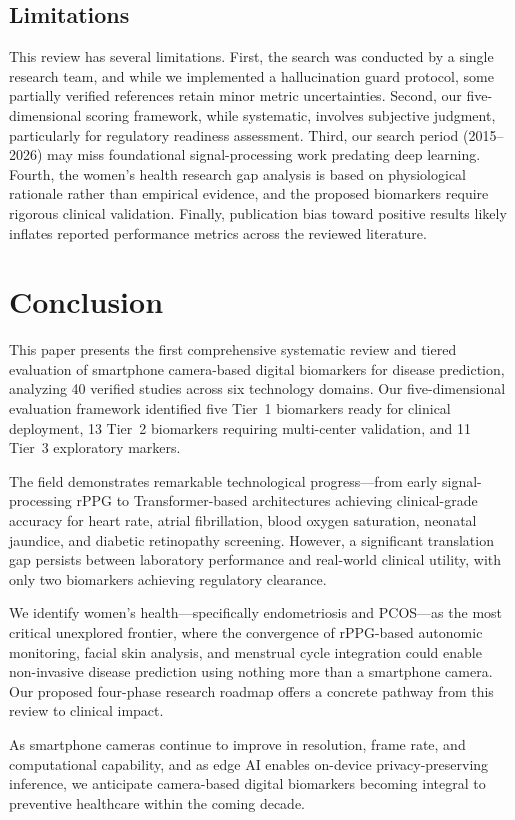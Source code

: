 \documentclass[conference]{IEEEtran}
\begin{document}
\subsection{Limitations}

This review has several limitations. First, the search was conducted by a single research team, and while we implemented a hallucination guard protocol, some partially verified references retain minor metric uncertainties. Second, our five-dimensional scoring framework, while systematic, involves subjective judgment, particularly for regulatory readiness assessment. Third, our search period (2015--2026) may miss foundational signal-processing work predating deep learning. Fourth, the women's health research gap analysis is based on physiological rationale rather than empirical evidence, and the proposed biomarkers require rigorous clinical validation. Finally, publication bias toward positive results likely inflates reported performance metrics across the reviewed literature.

\section{Conclusion}

This paper presents the first comprehensive systematic review and tiered evaluation of smartphone camera-based digital biomarkers for disease prediction, analyzing 40 verified studies across six technology domains. Our five-dimensional evaluation framework identified five Tier~1 biomarkers ready for clinical deployment, 13 Tier~2 biomarkers requiring multi-center validation, and 11 Tier~3 exploratory markers.

The field demonstrates remarkable technological progress---from early signal-processing rPPG to Transformer-based architectures achieving clinical-grade accuracy for heart rate, atrial fibrillation, blood oxygen saturation, neonatal jaundice, and diabetic retinopathy screening. However, a significant translation gap persists between laboratory performance and real-world clinical utility, with only two biomarkers achieving regulatory clearance.

We identify women's health---specifically endometriosis and PCOS---as the most critical unexplored frontier, where the convergence of rPPG-based autonomic monitoring, facial skin analysis, and menstrual cycle integration could enable non-invasive disease prediction using nothing more than a smartphone camera. Our proposed four-phase research roadmap offers a concrete pathway from this review to clinical impact.

As smartphone cameras continue to improve in resolution, frame rate, and computational capability, and as edge AI enables on-device privacy-preserving inference, we anticipate camera-based digital biomarkers becoming integral to preventive healthcare within the coming decade.



\end{document}
